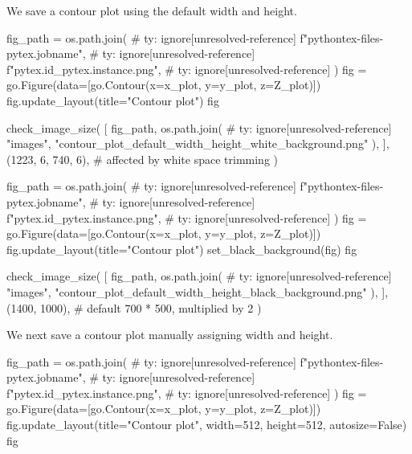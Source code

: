 \documentclass[oneside]{book}
\begin{document}
\begin{mdcell}
We save a contour plot using the default width and height.
\end{mdcell}

\begin{pycell}
fig_path = os.path.join(  # ty: ignore[unresolved-reference]
    f"pythontex-files-{pytex.jobname}",  # ty: ignore[unresolved-reference]
    f"{pytex.id}_{pytex.instance}.png",  # ty: ignore[unresolved-reference]
)
fig = go.Figure(data=[go.Contour(x=x_plot, y=y_plot, z=Z_plot)])
fig.update_layout(title="Contour plot")
fig
\end{pycell}

\begin{pycell}
check_image_size(
    [
        fig_path,
        os.path.join(  # ty: ignore[unresolved-reference]
            "images", "contour_plot_default_width_height_white_background.png"
        ),
    ],
    (1223, 6, 740, 6),  # affected by white space trimming
)
\end{pycell}

\begin{pycell}
fig_path = os.path.join(  # ty: ignore[unresolved-reference]
    f"pythontex-files-{pytex.jobname}",  # ty: ignore[unresolved-reference]
    f"{pytex.id}_{pytex.instance}.png",  # ty: ignore[unresolved-reference]
)
fig = go.Figure(data=[go.Contour(x=x_plot, y=y_plot, z=Z_plot)])
fig.update_layout(title="Contour plot")
set_black_background(fig)
fig
\end{pycell}

\begin{pycell}
check_image_size(
    [
        fig_path,
        os.path.join(  # ty: ignore[unresolved-reference]
            "images", "contour_plot_default_width_height_black_background.png"
        ),
    ],
    (1400, 1000),  # default 700 * 500, multiplied by 2
)
\end{pycell}

\begin{mdcell}
We next save a contour plot manually assigning width and height.
\end{mdcell}

\begin{pycell}
fig_path = os.path.join(  # ty: ignore[unresolved-reference]
    f"pythontex-files-{pytex.jobname}",  # ty: ignore[unresolved-reference]
    f"{pytex.id}_{pytex.instance}.png",  # ty: ignore[unresolved-reference]
)
fig = go.Figure(data=[go.Contour(x=x_plot, y=y_plot, z=Z_plot)])
fig.update_layout(title="Contour plot", width=512, height=512, autosize=False)
fig
\end{pycell}
\end{document}
